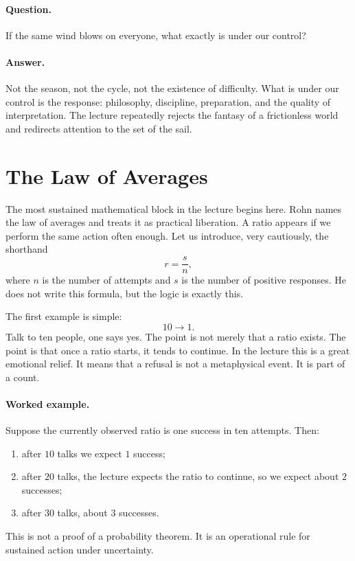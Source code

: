 \paragraph{Question.} If the same wind blows on everyone, what exactly is under our control?

\paragraph{Answer.} Not the season, not the cycle, not the existence of difficulty. What is under our control is the response: philosophy, discipline, preparation, and the quality of interpretation. The lecture repeatedly rejects the fantasy of a frictionless world and redirects attention to the set of the sail.

\section{The Law of Averages}

The most sustained mathematical block in the lecture begins here. Rohn names the law of averages and treats it as practical liberation. A ratio appears if we perform the same action often enough. Let us introduce, very cautiously, the shorthand
\begin{equation}
r = \frac{s}{n},
\end{equation}
where \(n\) is the number of attempts and \(s\) is the number of positive responses. He does not write this formula, but the logic is exactly this.

The first example is simple:
\begin{equation}
10 \to 1.
\end{equation}
Talk to ten people, one says yes. The point is not merely that a ratio exists. The point is that once a ratio starts, it tends to continue. In the lecture this is a great emotional relief. It means that a refusal is not a metaphysical event. It is part of a count.

\paragraph{Worked example.} Suppose the currently observed ratio is one success in ten attempts. Then:
\begin{enumerate}
\item after \(10\) talks we expect \(1\) success;
\item after \(20\) talks, the lecture expects the ratio to continue, so we expect about \(2\) successes;
\item after \(30\) talks, about \(3\) successes.
\end{enumerate}
This is not a proof of a probability theorem. It is an operational rule for sustained action under uncertainty.

